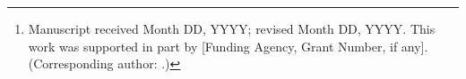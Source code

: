 \documentclass[journal]{IEEEtran}
\begin{document}
\title{\journalTitle}

\author{ %

\thanks{Manuscript received Month DD, YYYY; revised Month DD, YYYY. This work was supported in part by [Funding Agency, Grant Number, if any]. (Corresponding author: \correspondingAuthor.)} %
}


\maketitle




\IEEEpeerreviewmaketitle %









\end{document}
